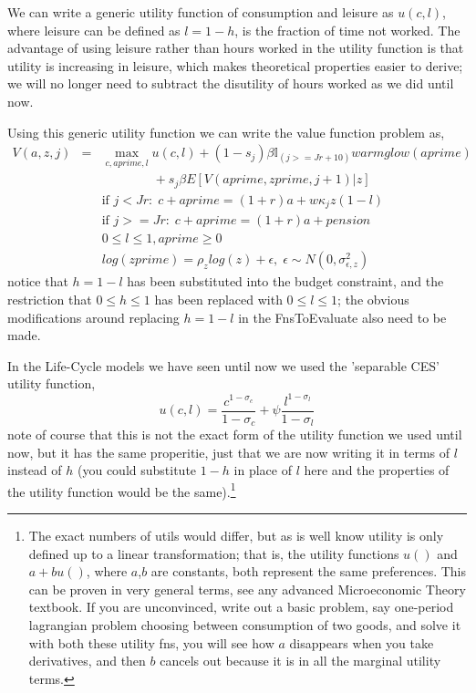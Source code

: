 We can write a generic utility function of consumption and leisure as $u(c,l)$, where leisure can be defined as $l=1-h$, is the fraction of time not worked. The advantage of using leisure rather than hours worked in the utility function is that utility is increasing in leisure, which makes theoretical properties easier to derive; we will no longer need to subtract the disutility of hours worked as we did until now.

Using this generic utility function we can write the value function problem as,
\begin{eqnarray*}
 V(a,z,j)&=& \max_{c,aprime,l} u(c,l) + (1-s_j)\beta  \mathbb{I}_{(j>=Jr+10)} warmglow(aprime)  \\
 && \quad \quad \quad \quad + s_j \beta E[V(aprime,zprime,j+1)|z] \\
&& \text{if }j<Jr: \; c+aprime=(1+r)a+w \kappa_j z (1-l)\\
&& \text{if }j>=Jr: \; c+aprime=(1+r)a +pension\\
&& 0\leq l \leq 1, aprime\geq 0 \\
&& log(zprime)=\rho_z log(z) + \epsilon, \; \epsilon \sim N(0,\sigma_{\epsilon,z}^2)
\end{eqnarray*}
notice that $h=1-l$ has been substituted into the budget constraint, and the restriction that $0 \leq h \leq 1$ has been replaced with $0 \leq l \leq 1$; the obvious modifications around replacing $h=1-l$ in the FnsToEvaluate also need to be made.

In the Life-Cycle models we have seen until now we used the 'separable CES' utility function,
\begin{equation*}
 u(c,l)=\frac{c^{1-\sigma_c}}{1-\sigma_c} + \psi \frac{l^{1-\sigma_l}}{1-\sigma_l}
\end{equation*}
note of course that this is not the exact form of the utility function we used until now, but it has the same properitie, just that we are now writing it in terms of $l$ instead of $h$ (you could substitute $1-h$ in place of $l$ here and the properties of the utility function would be the same).\footnote{The exact numbers of utils would differ, but as is well know utility is only defined up to a linear transformation; that is, the utility functions $u()$ and $a+bu()$, where $a$,$b$ are constants, both represent the same preferences. This can be proven in very general terms, see any advanced Microeconomic Theory textbook. If you are unconvinced, write out a basic problem, say one-period lagrangian problem choosing between consumption of two goods, and solve it with both these utility fns, you will see how $a$ disappears when you take derivatives, and then $b$ cancels out because it is in all the marginal utility terms.}

